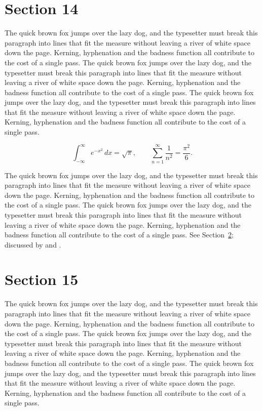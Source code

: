 \documentclass{article}
\begin{document}
\section{Section 14}
\label{sec:14}
The quick brown fox jumps over the lazy dog, and the typesetter must break this paragraph into lines that fit the measure without leaving a river of white space down the page. Kerning, hyphenation and the badness function all contribute to the cost of a single pass. The quick brown fox jumps over the lazy dog, and the typesetter must break this paragraph into lines that fit the measure without leaving a river of white space down the page. Kerning, hyphenation and the badness function all contribute to the cost of a single pass. The quick brown fox jumps over the lazy dog, and the typesetter must break this paragraph into lines that fit the measure without leaving a river of white space down the page. Kerning, hyphenation and the badness function all contribute to the cost of a single pass. 

\begin{equation}\label{eq:14}
\int_{-\infty}^{\infty} e^{-x^{2}}\,dx = \sqrt{\pi}, \qquad
\sum_{n=1}^{\infty} \frac{1}{n^{2}} = \frac{\pi^{2}}{6}.
\end{equation}

The quick brown fox jumps over the lazy dog, and the typesetter must break this paragraph into lines that fit the measure without leaving a river of white space down the page. Kerning, hyphenation and the badness function all contribute to the cost of a single pass. The quick brown fox jumps over the lazy dog, and the typesetter must break this paragraph into lines that fit the measure without leaving a river of white space down the page. Kerning, hyphenation and the badness function all contribute to the cost of a single pass. 
See Section~\ref{sec:15}; discussed by \textcite{k5} and \textcite{l2}.
\section{Section 15}
\label{sec:15}
The quick brown fox jumps over the lazy dog, and the typesetter must break this paragraph into lines that fit the measure without leaving a river of white space down the page. Kerning, hyphenation and the badness function all contribute to the cost of a single pass. The quick brown fox jumps over the lazy dog, and the typesetter must break this paragraph into lines that fit the measure without leaving a river of white space down the page. Kerning, hyphenation and the badness function all contribute to the cost of a single pass. The quick brown fox jumps over the lazy dog, and the typesetter must break this paragraph into lines that fit the measure without leaving a river of white space down the page. Kerning, hyphenation and the badness function all contribute to the cost of a single pass. 
\end{document}
